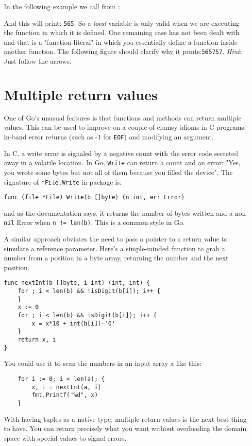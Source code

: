In the following example we call  from :

And this will print: \texttt{565}. So a \emph{local} variable is only
valid when we are executing the function in which it is defined. One
remaining case has not been dealt with and that is a "function
literal" in which you essentially define a function inside another
function. The following figure should clarify why it
prints:\texttt{565757}. \emph{Hint}: Just follow the arrows.



\section{Multiple return values}
\label{sec:multiple return}
One of Go's unusual features is that functions and methods can return multiple
values. This can be used to improve on a couple of clumsy idioms in C programs:
in-band error returns (such as -1 for \texttt{EOF}) and modifying an argument.

In C, a write error is signaled by a negative count with the error code
secreted away in a volatile location. In Go, \lstinline{Write} can return a count and an
error: "Yes, you wrote some bytes but not all of them because you filled the
device". The signature of \lstinline{*File.Write} in package
 is:
\begin{lstlisting}
func (file *File) Write(b []byte) (n int, err Error)
\end{lstlisting}
and as the documentation says, it returns the number of bytes written and a
non-\lstinline{nil} Error when \lstinline{n != len(b)}. This is a common
style in Go.

A similar approach obviates the need to pass a pointer to a return value to
simulate a reference parameter. Here's a simple-minded function to grab a
number from a position in a byte array, returning the number and the next
position.
\begin{lstlisting}
func nextInt(b []byte, i int) (int, int) {
    for ; i < len(b) && !isDigit(b[i]); i++ {
    }
    x := 0
    for ; i < len(b) && isDigit(b[i]); i++ {
        x = x*10 + int(b[i])-'0'
    }
    return x, i
}
\end{lstlisting}
You could use it to scan the numbers in an input array a like this:
\begin{lstlisting}
    for i := 0; i < len(a); {
        x, i = nextInt(a, i)
        fmt.Printf("%d", x)
    }
\end{lstlisting}
With having tuples as a native type, multiple return values is the next
best thing to have. You can return precisely what you want without
overloading the domain space with special values to signal errors.

